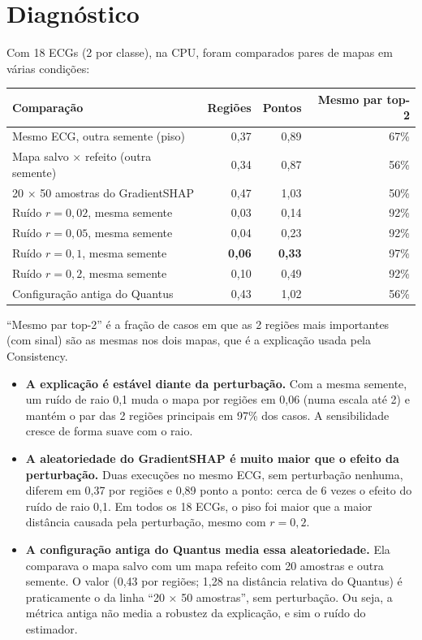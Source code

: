 \documentclass[11pt,a4paper]{article}
\begin{document}
\section{Diagnóstico}
Com 18 ECGs (2 por classe), na CPU, foram comparados pares de mapas em várias condições:
\begin{center}\small
\begin{tabularx}{\linewidth}{Xrrr}
\toprule
\textbf{Comparação} & \textbf{Regiões} & \textbf{Pontos} & \textbf{Mesmo par top-2} \\
\midrule
Mesmo ECG, outra semente (piso) & 0,37 & 0,89 & 67\% \\
Mapa salvo × refeito (outra semente) & 0,34 & 0,87 & 56\% \\
20 × 50 amostras do GradientSHAP & 0,47 & 1,03 & 50\% \\
\addlinespace
Ruído $r = 0{,}02$, mesma semente & 0,03 & 0,14 & 92\% \\
Ruído $r = 0{,}05$, mesma semente & 0,04 & 0,23 & 92\% \\
Ruído $r = 0{,}1$, mesma semente & \textbf{0,06} & \textbf{0,33} & 97\% \\
Ruído $r = 0{,}2$, mesma semente & 0,10 & 0,49 & 92\% \\
\addlinespace
Configuração antiga do Quantus & 0,43 & 1,02 & 56\% \\
\bottomrule
\end{tabularx}
\end{center}
“Mesmo par top-2” é a fração de casos em que as 2 regiões mais importantes (com sinal) são as mesmas nos dois mapas, que é a explicação usada pela Consistency.

\begin{itemize}
\item \textbf{A explicação é estável diante da perturbação.} Com a mesma semente, um ruído de raio 0,1 muda o mapa por regiões em 0,06 (numa escala até 2) e mantém o par das 2 regiões principais em 97\% dos casos. A sensibilidade cresce de forma suave com o raio.
\item \textbf{A aleatoriedade do GradientSHAP é muito maior que o efeito da perturbação.} Duas execuções no mesmo ECG, sem perturbação nenhuma, diferem em 0,37 por regiões e 0,89 ponto a ponto: cerca de 6 vezes o efeito do ruído de raio 0,1. Em todos os 18 ECGs, o piso foi maior que a maior distância causada pela perturbação, mesmo com $r = 0{,}2$.
\item \textbf{A configuração antiga do Quantus media essa aleatoriedade.} Ela comparava o mapa salvo com um mapa refeito com 20 amostras e outra semente. O valor (0,43 por regiões; 1,28 na distância relativa do Quantus) é praticamente o da linha “20 × 50 amostras”, sem perturbação. Ou seja, a métrica antiga não media a robustez da explicação, e sim o ruído do estimador.
\end{itemize}
\end{document}
